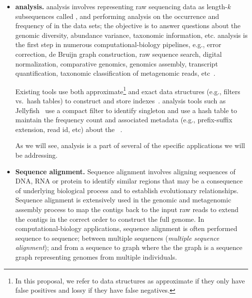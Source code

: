 \begin{itemize}[leftmargin=*]

\item {\bf \Kmer analysis.}
\Kmer analysis involves representing raw sequencing data as length-$k$ subsequences called \kmers, and performing analysis on the occurrence and frequency of \kmers in the data sets; the objective is to answer questions about the genomic diversity, abundance variance, taxonomic information, etc. \Kmer analysis is the first step in numerous computational-biology pipelines, e.g., error correction, de Bruijn graph construction, raw sequence search, digital normalization, comparative genomics, genomics assembly, transcript quantification, taxonomic classification of metagenomic reads, etc~\cite{wood2014kraken,GeorganasEHG18,hofmeyr2020terabase,solomon2016fast,PatroSailfish:2014,PandeyABFJP18Cell,PandeyBJP17a,PandeyBJP17b}.

Existing tools use both  approximate\footnote{In this proposal, we refer to data structures as approximate if they only have false positives and lossy if they have false negatives.} and exact data structures (e.g., filters vs.\ hash tables) to construct and store \kmer indexes~\cite{MarccaisKi11,PandeyBJP17a}.  \kmer analysis tools such as  Jellyfish~\cite{MarccaisKi11} use a compact filter to identify singleton \kmers and use a hash table to maintain the frequency count and associated metadata (e.g., prefix-suffix extension, read id, etc) about the \kmers~\cite{HofmeyrEGC20}.

As we will see, \kmer analysis is a part of several of the specific applications we will be addressing.


\item {\bf Sequence alignment.} Sequence alignment involves aligning sequences of DNA, RNA or protein to identify similar regions that may be a consequence of underlying biological process and to establish evolutionary relationships.
Sequence alignment is extensively used in the genomic and metagenomic assembly process to map the contigs back to the input raw reads to extend the contigs in the correct order to construct the full genome. In computational-biology applications, sequence alignment is often performed sequence to sequence; between multiple sequences (\emph{multiple sequence alignment}); and from a sequence to graph where the the graph is a sequence graph representing genomes from multiple individuals.


\end{itemize}
